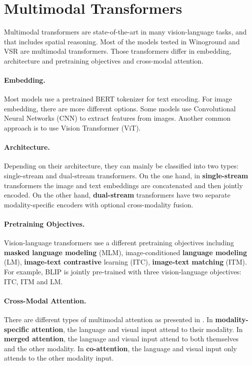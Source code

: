 \section{Multimodal Transformers} \label{sec:multimodal_transformers}

Multimodal transformers are state-of-the-art in many vision-language tasks, and that includes spatial reasoning. Most of the models tested in Winoground \cite{thrush2022winoground} and VSR \cite{liu2022visual} are multimodal transformers. Those transformers differ in embedding, architecture and pretraining objectives and cross-modal attention.

\paragraph{Embedding.} Most models use a pretrained BERT tokenizer for text encoding. For image embedding, there are more different options. Some models use Convolutional Neural Networks (CNN) to extract features from images. Another common approach is to use Vision Transformer (ViT).

\paragraph{Architecture.} Depending on their architecture, they can mainly be classified into two types: single-stream and dual-stream transformers. On the one hand, in \textbf{single-stream} transformers the image and text embeddings are concatenated and then jointly encoded. On the other hand, \textbf{dual-stream} transformers have two separate modality-specific encoders with optional cross-modality fusion.

\paragraph{Pretraining Objectives.} Vision-language transformers use a different pretraining objectives including \textbf{masked language modeling} (MLM), image-conditioned \textbf{language modeling} (LM), \textbf{image-text contrastive} learning (ITC), \textbf{image-text matching} (ITM). For example, BLIP \cite{li2022blip} is jointly pre-trained with three vision-language objectives: ITC, ITM and LM.

\paragraph{Cross-Modal Attention.} There are different types of multimodal attention as presented in \cite{hendricks2021decoupling}. In \textbf{modality-specific attention}, the language and visual input attend to their modality. In \textbf{merged attention}, the language and visual input attend to both themselves and the other modality. In \textbf{co-attention}, the language and visual input only attends to the other modality input.

